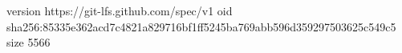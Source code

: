 version https://git-lfs.github.com/spec/v1
oid sha256:85335e362acd7c4821a829716bf1ff5245ba769abb596d359297503625c549c5
size 5566
